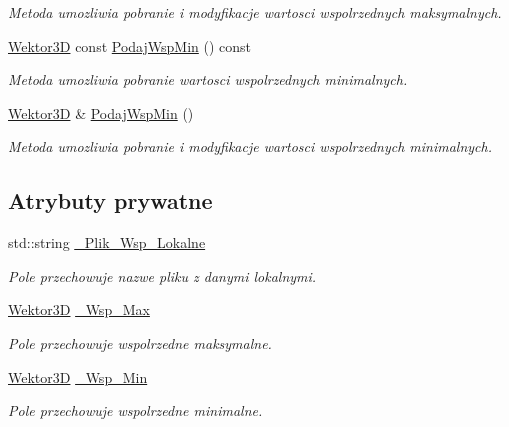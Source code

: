 \begin{DoxyCompactItemize}
\begin{DoxyCompactList}\small\item\em Metoda umozliwia pobranie i modyfikacje wartosci wspolrzednych maksymalnych. \end{DoxyCompactList}\item 
\hyperlink{classSWektor}{Wektor3D} const \hyperlink{classObiektSceny_a81f3173a7b40fdf30fd0488e470b86a6}{Podaj\+Wsp\+Min} () const
\begin{DoxyCompactList}\small\item\em Metoda umozliwia pobranie wartosci wspolrzednych minimalnych. \end{DoxyCompactList}\item 
\hyperlink{classSWektor}{Wektor3D} \& \hyperlink{classObiektSceny_a2f660e413ae6ed3eb0df7fac9881cf8a}{Podaj\+Wsp\+Min} ()
\begin{DoxyCompactList}\small\item\em Metoda umozliwia pobranie i modyfikacje wartosci wspolrzednych minimalnych. \end{DoxyCompactList}\end{DoxyCompactItemize}
\subsection*{Atrybuty prywatne}
\begin{DoxyCompactItemize}
\item 
std\+::string \hyperlink{classObiektSceny_abd56bb7b6b0db7ecef8055ce16131358}{\+\_\+\+Plik\+\_\+\+Wsp\+\_\+\+Lokalne}
\begin{DoxyCompactList}\small\item\em Pole przechowuje nazwe pliku z danymi lokalnymi. \end{DoxyCompactList}\item 
\hyperlink{classSWektor}{Wektor3D} \hyperlink{classObiektSceny_a09bfe62996fd73bbc7876524b211ce20}{\+\_\+\+Wsp\+\_\+\+Max}
\begin{DoxyCompactList}\small\item\em Pole przechowuje wspolrzedne maksymalne. \end{DoxyCompactList}\item 
\hyperlink{classSWektor}{Wektor3D} \hyperlink{classObiektSceny_a7395dc947479c40e29636cd8e8c5bfd3}{\+\_\+\+Wsp\+\_\+\+Min}
\begin{DoxyCompactList}\small\item\em Pole przechowuje wspolrzedne minimalne. \end{DoxyCompactList}\end{DoxyCompactItemize}


